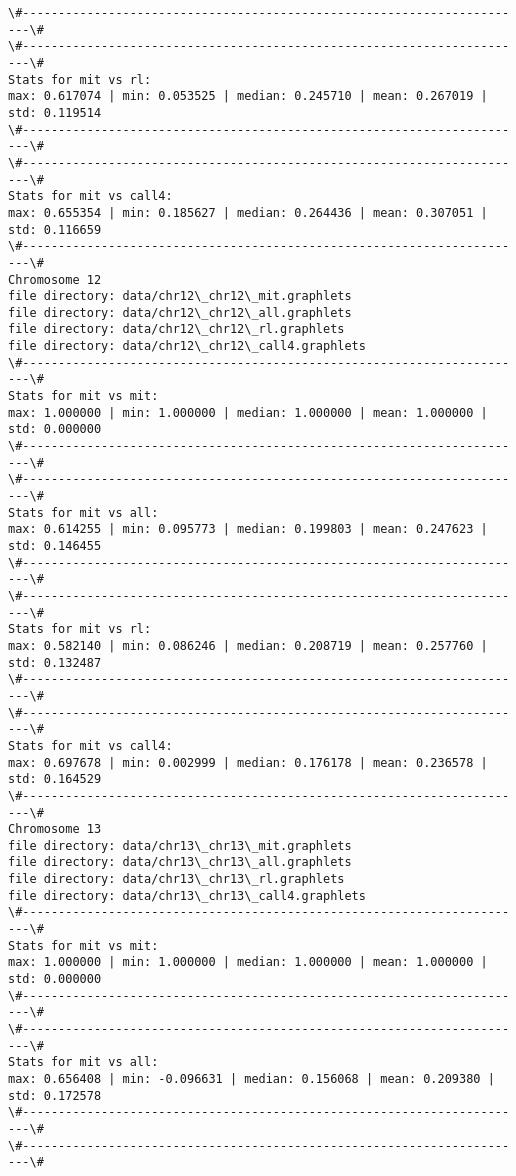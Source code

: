 \documentclass[11pt]{article}
\begin{document}
\begin{Verbatim}[commandchars=\\\{\}]
\#-----------------------------------------------------------------------\#
\#-----------------------------------------------------------------------\#
Stats for mit vs rl: 
max: 0.617074 | min: 0.053525 | median: 0.245710 | mean: 0.267019 | std: 0.119514
\#-----------------------------------------------------------------------\#
\#-----------------------------------------------------------------------\#
Stats for mit vs call4: 
max: 0.655354 | min: 0.185627 | median: 0.264436 | mean: 0.307051 | std: 0.116659
\#-----------------------------------------------------------------------\#
Chromosome 12
file directory: data/chr12\_chr12\_mit.graphlets
file directory: data/chr12\_chr12\_all.graphlets
file directory: data/chr12\_chr12\_rl.graphlets
file directory: data/chr12\_chr12\_call4.graphlets
\#-----------------------------------------------------------------------\#
Stats for mit vs mit: 
max: 1.000000 | min: 1.000000 | median: 1.000000 | mean: 1.000000 | std: 0.000000
\#-----------------------------------------------------------------------\#
\#-----------------------------------------------------------------------\#
Stats for mit vs all: 
max: 0.614255 | min: 0.095773 | median: 0.199803 | mean: 0.247623 | std: 0.146455
\#-----------------------------------------------------------------------\#
\#-----------------------------------------------------------------------\#
Stats for mit vs rl: 
max: 0.582140 | min: 0.086246 | median: 0.208719 | mean: 0.257760 | std: 0.132487
\#-----------------------------------------------------------------------\#
\#-----------------------------------------------------------------------\#
Stats for mit vs call4: 
max: 0.697678 | min: 0.002999 | median: 0.176178 | mean: 0.236578 | std: 0.164529
\#-----------------------------------------------------------------------\#
Chromosome 13
file directory: data/chr13\_chr13\_mit.graphlets
file directory: data/chr13\_chr13\_all.graphlets
file directory: data/chr13\_chr13\_rl.graphlets
file directory: data/chr13\_chr13\_call4.graphlets
\#-----------------------------------------------------------------------\#
Stats for mit vs mit: 
max: 1.000000 | min: 1.000000 | median: 1.000000 | mean: 1.000000 | std: 0.000000
\#-----------------------------------------------------------------------\#
\#-----------------------------------------------------------------------\#
Stats for mit vs all: 
max: 0.656408 | min: -0.096631 | median: 0.156068 | mean: 0.209380 | std: 0.172578
\#-----------------------------------------------------------------------\#
\#-----------------------------------------------------------------------\#

\end{Verbatim}
\end{document}
